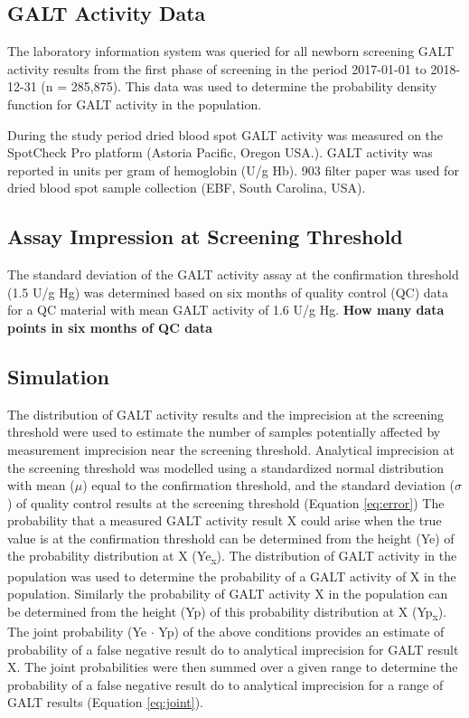 \documentclass[review]{elsarticle}
\begin{document}
\subsection*{GALT Activity Data}
\label{sec:org82f5671}
The laboratory information system was queried for all newborn
screening GALT activity results from the first phase of screening in
the period 2017-01-01 to 2018-12-31 (n = 285,875). This data was used
to determine the probability density function for GALT activity in the
population.

During the study period dried blood spot GALT activity was measured
on the SpotCheck Pro platform (Astoria Pacific, Oregon USA.). GALT
activity was reported in units per gram of hemoglobin (U/g Hb). 903
filter paper was used for dried blood spot sample collection (EBF,
South Carolina, USA).

\subsection*{Assay Impression at Screening Threshold}
\label{sec:org5beb283}
The standard deviation of the GALT activity assay at the confirmation
threshold (1.5 U/g Hg) was determined based on six months of quality
control (QC) data for a QC material with mean GALT activity of 1.6 U/g
Hg.  \textbf{How many data points in six months of QC data}

\subsection*{Simulation}
\label{sec:orgd0ff531}
The distribution of GALT activity results and the imprecision at the
screening threshold were used to estimate the number of samples
potentially affected by measurement imprecision near the screening
threshold. Analytical imprecision at the screening threshold was
modelled using a standardized normal distribution with mean (\(\mu\))
equal to the confirmation threshold, and the standard deviation
(\(\sigma\)) of quality control results at the screening threshold
(Equation \ref{eq:error}) The probability that a measured GALT
activity result X could arise when the true value is at the
confirmation threshold can be determined from the height (Ye) of the
probability distribution at X (Ye\textsubscript{x}). The distribution of GALT
activity in the population was used to determine the probability of a
GALT activity of X in the population. Similarly the probability of
GALT activity X in the population can be determined from the height
(Yp) of this probability distribution at X (Yp\textsubscript{x}). The joint
probability (Ye \(\cdot\) Yp) of the above conditions provides an estimate
of probability of a false negative result do to analytical imprecision
for GALT result X. The joint probabilities were then summed over a
given range to determine the probability of a false negative result do
to analytical imprecision for a range of GALT results (Equation
\ref{eq:joint}).
\end{document}
